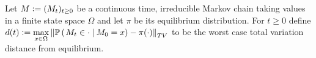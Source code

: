\begin{definition}\label{def:eq_distance}
Let $M \vcentcolon= (M_t)_{t \geq 0}$ be a continuous time, irreducible Markov chain taking values in a finite state space $\Omega$ and let $\pi$ be its equilibrium distribution. For $t \geq 0$ define $d(t) \vcentcolon= \max\limits_{x \in \Omega} \left\Vert \mathbb{P} \left( \left. M_t \in \cdot\  \right| M_0 = x \right) - \pi(\cdot) \right\Vert_{TV}$ to be the worst case total variation distance from equilibrium. 
\end{definition}






